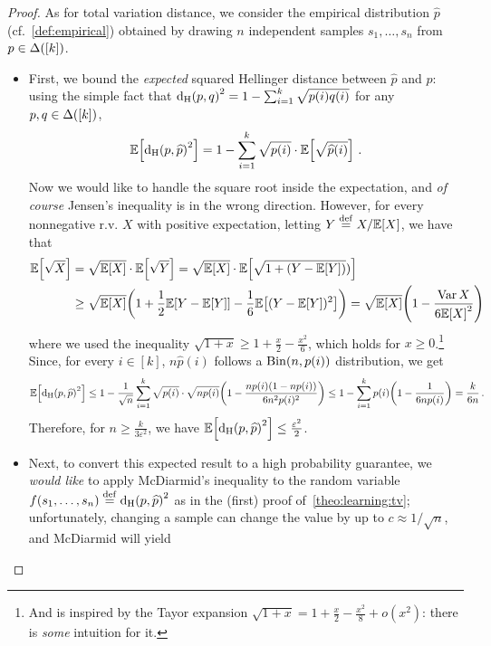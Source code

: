 \documentclass[10pt]{article}
\newcommand{\dst}{\varepsilon}
\newcommand{\ab}{k}
\newcommand{\ns}{n}
\begin{document}
\begin{proof}
    As for total variation distance, we consider the empirical distribution $\widehat{p}$ (cf.~\eqref{def:empirical}) obtained by drawing $\ns$ independent samples $s_1,\dots,s_\ns$ from $p\in\distribs{[\ab]}$.
    
    \begin{itemize}
      \item First, we bound the \emph{expected} squared Hellinger distance between $\widehat{p}$ and $p$: using the simple fact that
      $\hellinger{p}{q}^2 = 1-\sum_{i=1}^\ab \sqrt{p(i)q(i)}$ for any $p,q\in\distribs{[\ab]}$,
      \[
          \expect{ \hellinger{p}{\widehat{p}}^2 } = 1-\sum_{i=1}^\ab \sqrt{p(i)}\cdot \expect{\sqrt{\widehat{p}(i)}}\,.
      \]
      Now we would like to handle the square root inside the expectation, and \emph{of course} Jensen's inequality is in the wrong direction. However, for every nonnegative r.v. $X$ with positive expectation, letting $Y\stackrel{\rm def}{=} X/\mathbb{E}\!\left[X\right]$, we have that
      \begin{align*}
          \expect{\sqrt{X}} 
          &= \sqrt{\expect{X}}\cdot\expect{\sqrt{Y}}
          = \sqrt{\expect{X}}\cdot\expect{\sqrt{1+(Y-\expect{Y})})} \\
          &\geq \sqrt{\expect{X}} \mleft( 1+ \frac{1}{2}\expect{Y-\expect{Y}} - \frac{1}{6} \expect{(Y-\expect{Y})^2} \mright)
          = \sqrt{\expect{X}}\mleft(1-\frac{\var X}{6\expect{X}^2}\mright)
      \end{align*}
      where we used the inequality $\sqrt{1+x} \geq 1+\frac{x}{2}-\frac{x^2}{6}$, which holds for $x\geq 0$.\footnote{And is inspired by the Tayor expansion $\sqrt{1+x} = 1+\frac{x}{2} - \frac{x^2}{8} +o(x^2)$: there is \emph{some} intuition for it.}{} Since, for every $i\in[\ab]$, $\ns\widehat{p}(i)$ follows a $\binomial{\ns}{p(i)}$ distribution, we get
      \[
          \expect{ \hellinger{p}{\widehat{p}}^2 } \leq 1-\frac{1}{\sqrt{\ns}}\sum_{i=1}^\ab \sqrt{p(i)}\cdot\sqrt{\ns p(i)} \mleft(1-\frac{\ns p(i)(1-\ns p(i))}{6\ns^2 p(i)^2}\mright)
          \leq 1 - \sum_{i=1}^\ab p(i) \mleft(1-\frac{1}{6\ns p(i)}\mright) = \frac{\ab}{6\ns}\,.
      \]
      Therefore, for $\ns\geq \frac{\ab}{3\dst^2}$, we have $\expect{ \hellinger{p}{\widehat{p}}^2 }\leq \frac{\dst^2}{2}$.
      \item Next, to convert this expected result to a high probability guarantee, we \emph{would like} to apply McDiarmid's inequality to the random variable $f(s_1,\dots,s_\ns) \eqdef \hellinger{p}{\widehat{p}}^2$ as in the (first) proof of~\autoref{theo:learning:tv}; unfortunately, changing a sample can change the value by up to $c \approx 1/\sqrt{\ns}$, and McDiarmid will yield

\end{itemize}
\end{proof}
\end{document}
